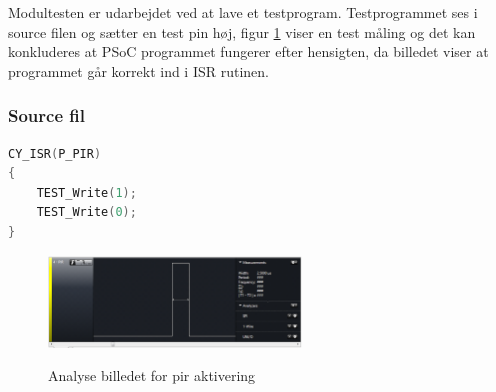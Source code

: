 Modultesten er udarbejdet ved at lave et testprogram. Testprogrammet ses i source filen og sætter en test pin høj, figur \ref{lab:test_maaling} viser en test måling og det kan konkluderes at PSoC programmet fungerer efter hensigten, da billedet viser at programmet går korrekt ind i ISR rutinen.    


\subsubsection*{Source fil}
\begin{lstlisting}[language=C]
CY_ISR(P_PIR)
{
    TEST_Write(1);
    TEST_Write(0); 
}
\end{lstlisting}


\begin{figure}[H]
\centering
{\includegraphics[width=0.60\textwidth]{filer/modultest/billeder/pir_testmaaling}}
\caption{Analyse billedet for pir aktivering}
\label{lab:test_maaling}
\end{figure}

